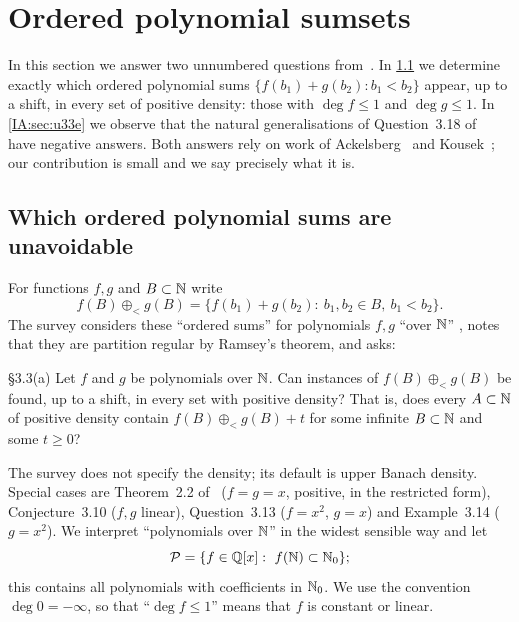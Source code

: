 %

\section{Ordered polynomial sumsets}\label{IA:sec:ordered}

In this section we answer two unnumbered questions from~\cite[\S3.3]{kra2023problems}. In
\cref{IA:sec:u33a} we determine exactly which ordered polynomial sums
$\{f(b_1)+g(b_2):b_1<b_2\}$ appear, up to a shift, in every set of positive density: those with
$\deg f\le1$ and $\deg g\le1$. In \cref{IA:sec:u33e} we observe that the natural generalisations of
Question~3.18 of~\cite{kra2023problems} have negative answers. Both answers rely on work of
Ackelsberg~\cite{ackelsberg2024counterexamples} and Kousek~\cite{kousek2025asymmetric}; our
contribution is small and we say precisely what it is.

\subsection{Which ordered polynomial sums are unavoidable}\label{IA:sec:u33a}
For functions $f,g$ and $B\subset\mathbb{N}$ write
\[
f(B)\oplus_<g(B)=\{f(b_1)+g(b_2):\ b_1,b_2\in B,\ b_1<b_2\}.
\]
The survey considers these ``ordered sums'' for polynomials $f,g$ ``over $\mathbb{N}$''
\cite[(5)]{kra2023problems}, notes that they are partition regular by Ramsey's theorem, and asks:

\begin{question}{\S3.3(a)}\label{IA:q:u33a}
Let $f$ and $g$ be polynomials over $\mathbb{N}$. Can instances of $f(B)\oplus_<g(B)$ be found, up to a
shift, in every set with positive density? That is, does every $A\subset\mathbb{N}$ of positive density
contain $f(B)\oplus_<g(B)+t$ for some infinite $B\subset\mathbb{N}$ and some $t\ge0$?
\end{question}

The survey does not specify the density; its default is upper Banach density. Special cases are
Theorem~2.2 of~\cite{kra2023problems} ($f=g=x$, positive, in the restricted form), Conjecture~3.10
($f,g$ linear), Question~3.13 ($f=x^2$, $g=x$) and Example~3.14 ($g=x^2$). We interpret ``polynomials
over $\mathbb{N}$'' in the widest sensible way and let
\[
\mathcal P=\{f\in\mathbb{Q}[x]:\ f(\mathbb{N})\subset\mathbb{N}_0\};
\]
this contains all polynomials with coefficients in $\mathbb{N}_0$. We use the convention
$\deg0=-\infty$, so that ``$\deg f\le1$'' means that $f$ is constant or linear.


